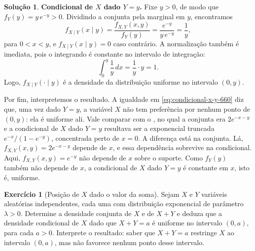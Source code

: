 \documentclass[12pt,portuguese]{article}
\theoremstyle{definition}
\theoremstyle{plainexercise}
\newtheorem{exercise}{Exercício}
\theoremstyle{starredexercise}
\theoremstyle{definition}
\newtheorem*{solution}{Solução}
\begin{document}
\begin{solution}
\noindent\textbf{Condicional de $X$ dado $Y = y$.}
Fixe $y > 0$, de modo que $f_Y(y) = y\,e^{-y} > 0$. Dividindo a conjunta pela marginal em
$y$, encontramos
\begin{equation}
  f_{X\mid Y}(x \mid y)
  = \frac{f_{X,Y}(x,y)}{f_Y(y)}
  = \frac{e^{-y}}{y\,e^{-y}}
  = \frac{1}{y},
  \label{eq:condicional-x-y-660}
\end{equation}
para $0 < x < y$, e $f_{X\mid Y}(x \mid y) = 0$ caso contrário. A normalização também é
imediata, pois o integrando é constante no intervalo de integração:
\[
  \int_0^{y} \frac{1}{y}\,dx
  = \frac{1}{y}\cdot y
  = 1.
\]
Logo, $f_{X\mid Y}(\cdot \mid y)$ é a densidade da distribuição uniforme no intervalo $(0,y)$.

Por fim, interpretemos o resultado. A igualdade em \eqref{eq:condicional-x-y-660} diz que,
uma vez dado $Y = y$, a variável $X$ não tem preferência por nenhum ponto de $(0,y)$: ela é
uniforme ali. Vale comparar com o , no qual
a conjunta era $2e^{-x-y}$ e a condicional de $X$ dado $Y = y$ resultava ser a exponencial
truncada $e^{-x}/(1-e^{-y})$, concentrada perto de $x = 0$. A diferença está na conjunta.
Lá, $f_{X,Y}(x,y) = 2e^{-x-y}$ depende de $x$, e essa dependência sobrevive na condicional.
Aqui, $f_{X,Y}(x,y) = e^{-y}$ não depende de $x$ sobre o suporte. Como $f_Y(y)$ também não
depende de $x$, a condicional de $X$ dado $Y = y$ é constante em $x$, isto é, uniforme.
\end{solution}

\begin{exercise}[Posição de $X$ dado o valor da soma]\label{exercise:uniforme-dado-soma}
Sejam $X$ e $Y$ variáveis aleatórias independentes, cada uma com distribuição exponencial de
parâmetro $\lambda > 0$. Determine a densidade conjunta de $X$ e de $X+Y$ e deduza que a
densidade condicional de $X$ dado que $X+Y = a$ é uniforme no intervalo $(0,a)$, para cada
$a > 0$. Interprete o resultado: saber que $X+Y = a$ restringe $X$ ao intervalo $(0,a)$, mas
não favorece nenhum ponto desse intervalo.
\end{exercise}
\end{document}

